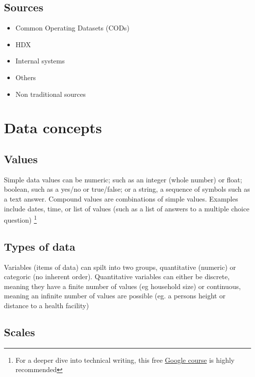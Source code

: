\documentclass[
  a4paper,
  onecolumn,
  oneside]{book}
\providecommand{\tightlist}{%
  \setlength{\itemsep}{0pt}\setlength{\parskip}{0pt}}\usepackage{longtable,booktabs,array}
\begin{document}
\hypertarget{sources}{%
\subsection{Sources}\label{sources}}

\begin{itemize}
\tightlist
\item
  Common Operating Datasets (CODs)
\item
  HDX
\item
  Internal systems
\item
  Others
\item
  Non traditional sources
\end{itemize}

\hypertarget{data-concepts}{%
\section{Data concepts}\label{data-concepts}}

\hypertarget{values}{%
\subsection{Values}\label{values}}

Simple data values can be numeric; such as an integer (whole number) or
float; boolean, such as a yes/no or true/false; or a string, a sequence
of symbols such as a text answer. Compound values are combinations of
simple values. Examples include dates, time, or list of values (such as
a list of answers to a multiple choice question) \footnote{For a deeper
  dive into technical writing, this free
  \href{https://developers.google.com/tech-writing/overview}{Google
  course} is highly recommended}

\hypertarget{types-of-data}{%
\subsection{Types of data}\label{types-of-data}}

Variables (items of data) can spilt into two groups, quantitative
(numeric) or categoric (no inherent order). Quantitative variables can
either be discrete, meaning they have a finite number of values (eg
household size) or continuous, meaning an infinite number of values are
possible (eg. a persons height or distance to a health facility)

\hypertarget{scales}{%
\subsection{Scales}\label{scales}}
\end{document}
